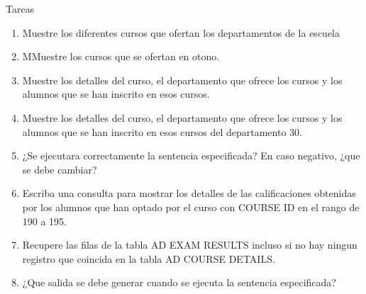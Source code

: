 \documentclass[12pt,letterpaper]{article}
\begin{document}
Tareas\\
\begin{enumerate}[1.]
    \item Muestre los diferentes cursos que ofertan los departamentos de la escuela\\

     \item MMuestre los cursos que se ofertan en otono.\\

    \item Muestre los detalles del curso, el departamento que ofrece los cursos y los alumnos que se han inscrito en esos cursos.
    \item Muestre los detalles del curso, el departamento que ofrece los cursos y los alumnos que se han inscrito en esos cursos del departamento 30.
    \item ¿Se ejecutara correctamente la sentencia especificada? En caso negativo, ¿que se debe cambiar?
      
    \item Escriba una consulta para mostrar los detalles de las calificaciones obtenidas por los alumnos que han optado por el curso con COURSE ID en el rango de 190 a 195.
      
    \item Recupere las filas de la tabla AD EXAM RESULTS incluso si no hay ningun registro que coincida en la tabla AD COURSE DETAILS.
      
    \item ¿Que salida se debe generar cuando se ejecuta la sentencia especificada?
		\end{enumerate}
\end{document}
